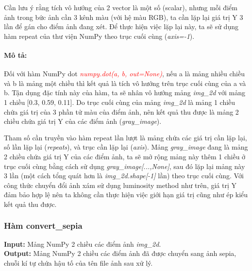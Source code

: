 \documentclass[]{article}
\begin{document}
Cần lưu ý rằng tích vô hướng của 2 vector là một số (scalar), nhưng mỗi điểm ảnh trong bức ảnh cần 3 kênh màu (với hệ màu RGB), ta cần lặp lại giá trị Y 3 lần để gán cho điểm ảnh đang xét. Để thực hiện việc lặp lại này, ta sẽ sử dụng hàm repeat của thư viện NumPy theo trục cuối cùng (\textit{axis=-1}).

\paragraph{Mô tả:}
Đối với hàm NumPy dot \textcolor{red}{\textit{numpy.dot(a, b, out=None)}}, nếu a là mảng nhiều chiều và b là mảng một chiều thì kết quả là tích vô hướng trên trục cuối cùng của a và b. Tận dụng đặc tính này của hàm, ta sẽ nhân vô hướng mảng \textit{img\_2d} với mảng 1 chiều [0.3, 0.59, 0.11]. Do trục cuối cùng của mảng \textit{img\_2d} là mảng 1 chiều chứa giá trị của 3 phần tử màu của điểm ảnh, nên kết quả thu được là mảng 2 chiều chứa giá trị Y của các điểm ảnh (\textit{gray\_image}). 

Tham số cần truyền vào hàm repeat lần lượt là mảng chứa các giá trị cần lặp lại, số lần lặp lại (\textit{repeats}), và trục cần lặp lại (\textit{axis}). Mảng \textit{gray\_image} đang là mảng 2 chiều chứa giá trị Y của các điểm ảnh, ta sẽ mở rộng mảng này thêm 1 chiều ở trục cuối cùng bằng cách sử dụng \textit{gray\_image[...,None]}, sau đó lặp lại mảng này 3 lần (một cách tổng quát hơn là \textit{img\_2d.shape[-1]} lần) theo trục cuối cùng. Với công thức chuyển đổi ảnh xám sử dụng luminosity method như trên, giá trị Y đảm bảo hợp lệ nên ta không cần thực hiện việc giới hạn giá trị cũng như ép kiểu kết quả thu được.

\subsubsection{Hàm convert\_sepia}
\textbf{Input:} Mảng NumPy 2 chiều các điểm ảnh \textit{img\_2d}. \\
\textbf{Output:} Mảng NumPy 2 chiều các điểm ảnh đã được chuyển sang ảnh sepia, chuỗi kí tự chứa hậu tố của tên file ảnh sau xử lý.
\end{document}
